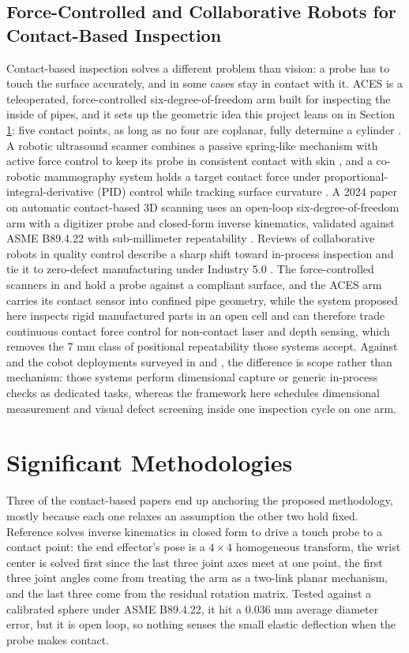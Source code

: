 \documentclass[conference]{IEEEtran}
\begin{document}
\subsection{Force-Controlled and Collaborative Robots for Contact-Based Inspection}
Contact-based inspection solves a different problem than vision: a probe has to touch the surface accurately, and in some cases stay in contact with it. ACES is a teleoperated, force-controlled six-degree-of-freedom arm built for inspecting the inside of pipes, and it sets up the geometric idea this project leans on in Section \ref{sec:methodologies}: five contact points, as long as no four are coplanar, fully determine a cylinder \cite{ref15}. A robotic ultrasound scanner combines a passive spring-like mechanism with active force control to keep its probe in consistent contact with skin \cite{ref16}, and a co-robotic mammography system holds a target contact force under proportional-integral-derivative (PID) control while tracking surface curvature \cite{ref17}. A 2024 paper on automatic contact-based 3D scanning uses an open-loop six-degree-of-freedom arm with a digitizer probe and closed-form inverse kinematics, validated against ASME B89.4.22 with sub-millimeter repeatability \cite{ref18}. Reviews of collaborative robots in quality control describe a sharp shift toward in-process inspection and tie it to zero-defect manufacturing under Industry 5.0 \cite{ref19}\cite{ref20}. The force-controlled scanners in \cite{ref16} and \cite{ref17} hold a probe against a compliant surface, and the ACES arm \cite{ref15} carries its contact sensor into confined pipe geometry, while the system proposed here inspects rigid manufactured parts in an open cell and can therefore trade continuous contact force control for non-contact laser and depth sensing, which removes the 7 mm class of positional repeatability those systems accept. Against \cite{ref18} and the cobot deployments surveyed in \cite{ref19} and \cite{ref20}, the difference is scope rather than mechanism: those systems perform dimensional capture or generic in-process checks as dedicated tasks, whereas the framework here schedules dimensional measurement and visual defect screening inside one inspection cycle on one arm.

\section{Significant Methodologies}
\label{sec:methodologies}
Three of the contact-based papers end up anchoring the proposed methodology, mostly because each one relaxes an assumption the other two hold fixed. Reference \cite{ref18} solves inverse kinematics in closed form to drive a touch probe to a contact point: the end effector's pose is a $4\times4$ homogeneous transform, the wrist center is solved first since the last three joint axes meet at one point, the first three joint angles come from treating the arm as a two-link planar mechanism, and the last three come from the residual rotation matrix. Tested against a calibrated sphere under ASME B89.4.22, it hit a 0.036 mm average diameter error, but it is open loop, so nothing senses the small elastic deflection when the probe makes contact.
\end{document}
